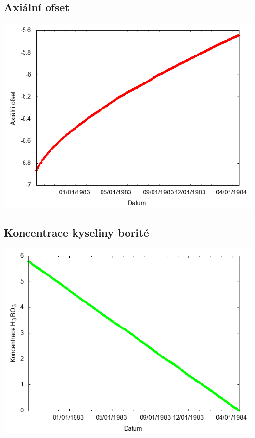 \documentclass[a4paper,twoside,11pt]{article}
\begin{document}
\subsection*{Axiální ofset}
\begin{center}
\includegraphics[width=.8\textwidth]{graphs/Disneyland_01_ao.png}
\end{center}

\subsection*{Koncentrace kyseliny borité}
\begin{center}
\includegraphics[width=.8\textwidth]{graphs/Disneyland_01_bc.png}
\end{center}
\end{document}
